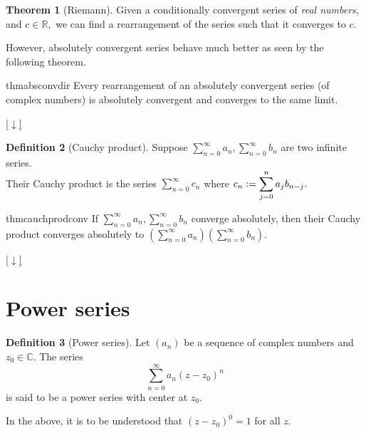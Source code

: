 \documentclass[12pt,oneside]{book}
\theoremstyle{definition}
\newtheorem{thm}{Theorem}
\numberwithin{thm}{chapter}
\newtheorem{defn}[thm]{Definition}
\newcommand{\downsym}{[$\downarrow$]}
\begin{document}
\begin{thm}[Riemann]
	Given a conditionally convergent series of \emph{real numbers,} and $c \in \mathbb{R},$ we can find a rearrangement of the series such that it converges to $c.$
\end{thm}

However, absolutely convergent series behave much better as seen by the following theorem.

\begin{restatable}[Dirichlet]{thm}{absconvdir}
\label{thm:absconvdir}
	Every rearrangement of an absolutely convergent series (of complex numbers) is absolutely convergent and converges to the same limit.
\end{restatable}
\begin{flushright}\hyperref[thm:absconvdir2]{\downsym}\end{flushright}

\begin{defn}[Cauchy product]\label{def:cauchprod}
	Suppose $\displaystyle\sum_{n=0}^{\infty}a_n, \displaystyle\sum_{n=0}^{\infty}b_n$ are two infinite series.\\
	Their Cauchy product is the series $\displaystyle\sum_{n=0}^{\infty}c_n$ where $c_n \vcentcolon= \displaystyle\sum_{j=0}^{n}a_{j}b_{n-j}.$
\end{defn}

\begin{restatable}{thm}{cauchprodconv}
\label{thm:cauchprodconv}
	If $\displaystyle\sum_{n=0}^{\infty}a_n, \displaystyle\sum_{n=0}^{\infty}b_n$ converge absolutely, then their Cauchy product converges absolutely to $\left(\displaystyle\sum_{n=0}^{\infty}a_n\right)\left(\displaystyle\sum_{n=0}^{\infty}b_n\right).$
\end{restatable}
\begin{flushright}\hyperref[thm:cauchprodconv2]{\downsym}\end{flushright}

\section{Power series}\label{sec:powseries}
\begin{defn}[Power series]
	Let $(a_n)$ be a sequence of complex numbers and $z_0 \in \mathbb{C}.$ The series
	\begin{equation} \label{eq:pow}
		\sum_{n=0}^{\infty}a_n(z - z_0)^n
	\end{equation}
	is said to be a power series with center at $z_0.$
\end{defn}
In the above, it is to be understood that $(z - z_0)^0 = 1$ for all $z.$
\end{document}
